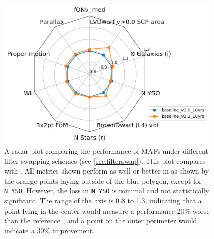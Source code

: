 \begin{figure}
  \centering
    \includegraphics[width=0.95\textwidth]{figures/radarplot.png}

\caption{A radar plot comparing the performance of MAFs under different filter swapping schemes (see \autoref{sec:filterswap}). This plot compares  with . All metrics shown perform as well or better in  as shown by the orange points laying outside of the blue polygon, except for \texttt{N~YSO}. However, the loss in \texttt{N~YSO} is minimal and not statistically significant. The range of the axis is 0.8 to 1.3, indicating that a point lying in the center would measure a performance 20\% worse than the reference \opsim, and a point on the outer perimeter would indicate a 30\% improvement.}
\label{fig:radar}
\end{figure}


\FloatBarrier



